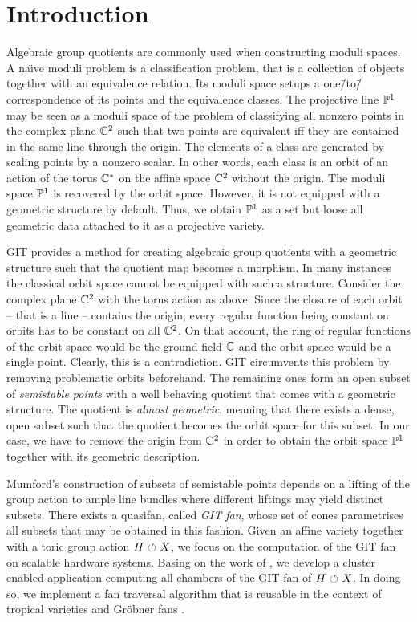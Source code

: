 \chapter{Introduction}

Algebraic group quotients are commonly used when constructing moduli spaces. A na\"{\i}ve moduli problem is a classification problem, that is a collection of objects together with an equivalence relation. Its moduli space setups a one\=/to\=/correspondence of its points and the equivalence classes. The projective line $\mathbb{P}^1$ may be seen as a moduli space of the problem of classifying all nonzero points in the complex plane $\mathbb{C}^2$ such that two points are equivalent iff they are contained in the same line through the origin. The elements of a class are generated by scaling points by a nonzero scalar. In other words, each class is an orbit of an action of the torus $\mathbb{C}^*$ on the affine space $\mathbb{C}^2$ without the origin. The moduli space $\mathbb{P}^1$ is recovered by the orbit space. However, it is not equipped with a geometric structure by default. Thus, we obtain $\mathbb{P}^1$ as a set but loose all geometric data attached to it as a projective variety. 

\ac{GIT} provides a method for creating algebraic group quotients with a geometric structure such that the quotient map becomes a morphism. In many instances the classical orbit space cannot be equipped with such a structure. Consider the complex plane $\mathbb{C}^2$ with the torus action as above. Since the closure of each orbit -- that is a line -- contains the origin, every regular function being constant on orbits has to be constant on all $\mathbb{C}^2$. On that account, the ring of regular functions of the orbit space would be the ground field $\mathbb{C}$ and the orbit space would be a single point. Clearly, this is a contradiction. \ac{GIT} circumvents this problem by removing problematic orbits beforehand. The remaining ones form an open subset of \emph{semistable points} with a well behaving quotient that comes with a geometric structure. The quotient is \emph{almost geometric}, meaning that there exists a dense, open subset such that the quotient becomes the orbit space for this subset. In our case, we have to remove the origin from $\mathbb{C}^2$ in order to obtain the orbit space $\mathbb{P}^1$ together with its geometric description.

Mumford's construction of subsets of semistable points depends on a lifting of the group action to ample line bundles where different liftings may yield distinct subsets. There exists a quasifan, called \emph{GIT fan}, whose set of cones parametrises all subsets that may be obtained in this fashion. Given an affine variety together with a toric group action $H{\ \circlearrowleft\ } X$, we focus on the computation of the GIT fan on scalable hardware systems. Basing on the work of \citeauthor{gitfan_symmetry} \cite{gitfan_symmetry}, we develop a cluster enabled application computing all chambers of the GIT fan of $H{\ \circlearrowleft\ } X$. In doing so, we implement a fan traversal algorithm that is reusable in the context of tropical varieties \cite{tropical_varities} and Gröbner fans \cite[chapter 3]{sturmfels}.

